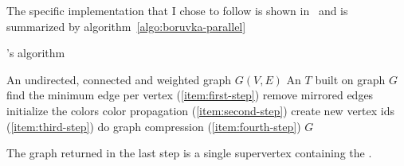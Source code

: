 \documentclass[a4paper,10pt]{article}
\begin{document}
The specific implementation that I chose to follow is shown in~\cite{generic-he-boruvka} and is summarized by algorithm~\ref{algo:boruvka-parallel}

\begin{algorithm}
	\caption{\brka's algorithm}\label{algo:boruvka-parallel}
	\begin{algorithmic}[1]
		\REQUIRE An undirected, connected and weighted graph $G(V, E)$
		\ENSURE An \mst$T$ built on graph $G$
		\STATE find the minimum edge per vertex (\ref{item:first-step})
		\STATE remove mirrored edges
		\STATE initialize the colors
		\STATE color propagation (\ref{item:second-step})
		\ENDWHILE
		\STATE create new vertex ids (\ref{item:third-step})
		\STATE do graph compression (\ref{item:fourth-step})
		\ENDWHILE
		\STATE\RETURN $G$
	\end{algorithmic}
\end{algorithm}

The graph returned in the last step is a single supervertex containing the \mst.
\end{document}
